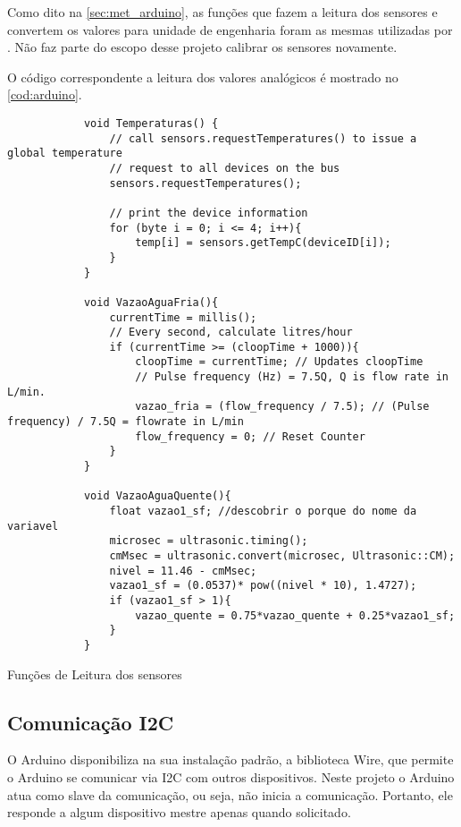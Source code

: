 		Como dito na \autoref{sec:met_arduino}, as funções que fazem a leitura dos sensores e convertem os valores para unidade de engenharia foram as mesmas utilizadas por \textcite{luiz2016}. Não faz parte do escopo desse projeto calibrar os sensores novamente.
		
		O código correspondente a leitura dos valores analógicos é mostrado no \autoref*{cod:arduino}. 
		
		
		\begin{listing}[!htb]
			\begin{verbatim}
			void Temperaturas() {
				// call sensors.requestTemperatures() to issue a global temperature 
				// request to all devices on the bus
				sensors.requestTemperatures();
				
				// print the device information
				for (byte i = 0; i <= 4; i++){
					temp[i] = sensors.getTempC(deviceID[i]);
				}
			}
			
			void VazaoAguaFria(){
				currentTime = millis();
				// Every second, calculate litres/hour
				if (currentTime >= (cloopTime + 1000)){
					cloopTime = currentTime; // Updates cloopTime
					// Pulse frequency (Hz) = 7.5Q, Q is flow rate in L/min.
					vazao_fria = (flow_frequency / 7.5); // (Pulse frequency) / 7.5Q = flowrate in L/min
					flow_frequency = 0; // Reset Counter
				}
			}
			
			void VazaoAguaQuente(){
				float vazao1_sf; //descobrir o porque do nome da variavel
				microsec = ultrasonic.timing();
				cmMsec = ultrasonic.convert(microsec, Ultrasonic::CM);
				nivel = 11.46 - cmMsec;
				vazao1_sf = (0.0537)* pow((nivel * 10), 1.4727);
				if (vazao1_sf > 1){
					vazao_quente = 0.75*vazao_quente + 0.25*vazao1_sf;
				}
			}	
			\end{verbatim}
			\caption{Funções de Leitura dos sensores}
			\label{cod:arduino}
		\end{listing}
	
		\subsection{Comunicação I2C}
			O Arduino disponibiliza na sua instalação padrão, a biblioteca Wire, que permite o Arduino se comunicar via I2C com outros dispositivos. Neste projeto o Arduino atua como slave da comunicação, ou seja, não inicia a comunicação. Portanto, ele responde a algum dispositivo mestre apenas quando solicitado.
			
